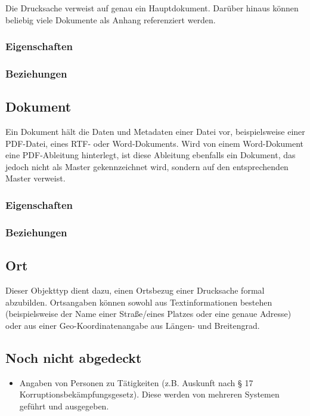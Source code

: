 Die Drucksache verweist auf genau ein Hauptdokument. Darüber hinaus
können beliebig viele Dokumente als Anhang referenziert werden.

\subsubsection{Eigenschaften}

\subsubsection{Beziehungen}

\subsection{Dokument}

Ein Dokument hält die Daten und Metadaten einer Datei vor,
beispielsweise einer PDF-Datei, eines RTF- oder Word-Dokuments. Wird von
einem Word-Dokument eine PDF-Ableitung hinterlegt, ist diese Ableitung
ebenfalls ein Dokument, das jedoch nicht als Master gekennzeichnet wird,
sondern auf den entsprechenden Master verweist.

\subsubsection{Eigenschaften}

\subsubsection{Beziehungen}

\subsection{Ort}

Dieser Objekttyp dient dazu, einen Ortsbezug einer Drucksache formal
abzubilden. Ortsangaben können sowohl aus Textinformationen bestehen
(beispielsweise der Name einer Straße/eines Platzes oder eine genaue
Adresse) oder aus einer Geo-Koordinatenangabe aus Längen- und
Breitengrad.

\subsection{Noch nicht abgedeckt}

\begin{itemize}
\item
  Angaben von Personen zu Tätigkeiten (z.B. Auskunft nach § 17
  Korruptionsbekämpfungsgesetz). Diese werden von mehreren Systemen
  geführt und ausgegeben.
\end{itemize}

